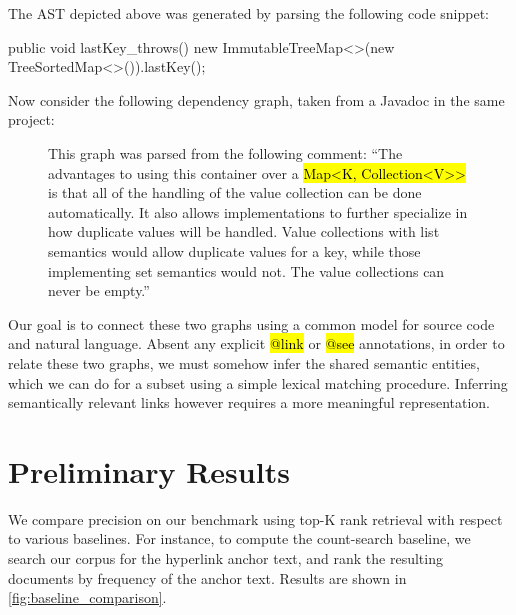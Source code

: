 \documentclass{article}
\newcommand{\tinline}[1]{%
    \begingroup%
    \sethlcolor{slightgray}%
    \hl{\ttfamily\footnotesize #1}%
    \endgroup
}
\begin{document}
\vspace{20pt}

\begin{figure}[H]
    \centering
    
    \label{fig:ast}
\end{figure}

\vspace{-30pt}The AST depicted above was generated by parsing the following code snippet:

\begin{javalisting}
public void lastKey_throws() {
    new ImmutableTreeMap<>(new TreeSortedMap<>()).lastKey();
}
\end{javalisting}

Now consider the following dependency graph, taken from a Javadoc in the same project:

\begin{figure}[H]
    \centering
    
    \caption{This graph was parsed from the following comment: ``The advantages to using this container over a \footnotesize\tinline{Map<K, Collection<V>{}>} is that all of the handling of the value collection can be done automatically. It also allows implementations to further specialize in how duplicate values will be handled. Value collections with list semantics would allow duplicate values for a key, while those implementing set semantics would not. The value collections can never be empty.''}
    \label{fig:eng}
\end{figure}

Our goal is to connect these two graphs using a common model for source code and natural language. Absent any explicit \tinline{@link} or \tinline{@see} annotations, in order to relate these two graphs, we must somehow infer the shared semantic entities, which we can do for a subset using a simple lexical matching procedure. Inferring semantically relevant links however requires a more meaningful representation.

\section{Preliminary Results}

We compare precision on our benchmark using top-K rank retrieval with respect to various baselines. For instance, to compute the count-search baseline, we search our corpus for the hyperlink anchor text, and rank the resulting documents by frequency of the anchor text. Results are shown in \autoref{fig:baseline_comparison}.
\end{document}
